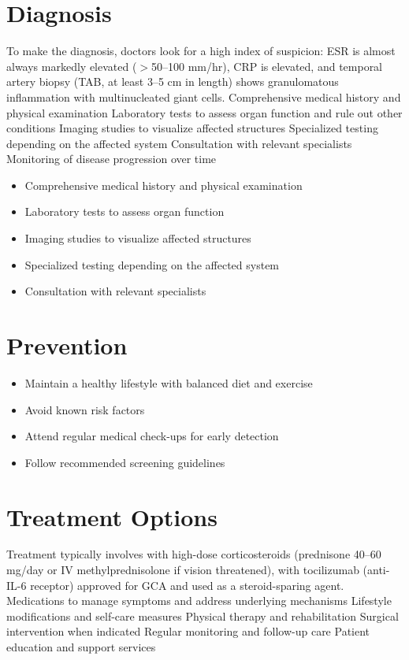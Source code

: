 \section{Diagnosis}
To make the diagnosis, doctors look for a high index of suspicion: ESR is almost always markedly elevated ($>$50--100 mm/hr), CRP is elevated, and temporal artery biopsy (TAB, at least 3--5 cm in length) shows granulomatous inflammation with multinucleated giant cells. Comprehensive medical history and physical examination Laboratory tests to assess organ function and rule out other conditions Imaging studies to visualize affected structures Specialized testing depending on the affected system Consultation with relevant specialists Monitoring of disease progression over time

\begin{itemize}[noitemsep]
  \item Comprehensive medical history and physical examination
  \item Laboratory tests to assess organ function
  \item Imaging studies to visualize affected structures
  \item Specialized testing depending on the affected system
  \item Consultation with relevant specialists
\end{itemize}
\section{Prevention}
\begin{itemize}[noitemsep]
  \item Maintain a healthy lifestyle with balanced diet and exercise
  \item Avoid known risk factors
  \item Attend regular medical check-ups for early detection
  \item Follow recommended screening guidelines
\end{itemize}
\section{Treatment Options}
Treatment typically involves with high-dose corticosteroids (prednisone 40--60 mg/day or IV methylprednisolone if vision threatened), with tocilizumab (anti-IL-6 receptor) approved for GCA and used as a steroid-sparing agent. Medications to manage symptoms and address underlying mechanisms Lifestyle modifications and self-care measures Physical therapy and rehabilitation Surgical intervention when indicated Regular monitoring and follow-up care Patient education and support services

